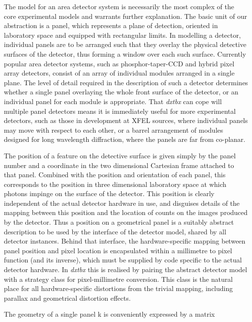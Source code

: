 \documentclass[preprint]{iucr}
\newcommand{\dxtbx}{\emph{dxtbx}\xspace}
\begin{document}
The model for an area detector system is necessarily the most complex of the 
core experimental models and warrants further explanation. The basic unit of our 
abstraction is a panel, which represents a plane of detection, oriented in 
laboratory space and equipped with rectangular limits. In modelling a detector,
individual panels are to be arranged such that they overlay the physical 
detective surfaces of the detector, thus forming a window over each such surface. 
Currently popular area detector systems, such as phosphor-taper-CCD and hybrid 
pixel array detectors, consist of an array of individual modules arranged in a 
single plane. The level of detail required in the description of such a detector 
determines whether a single panel overlaying the whole front surface of the 
detector, or an individual panel for each module is appropriate. That \dxtbx can 
cope will multiple panel detectors means it is immediately useful for more 
experimental detectors, such as those in development at XFEL sources, where 
individual panels may move with respect to each other, or a barrel arrangement 
of modules designed for long wavelength diffraction, where the panels are far 
from co-planar.

The position of a feature on the detective surface is given simply by the panel 
number and a coordinate in the two dimensional Cartesian frame attached to that 
panel. Combined with the position and orientation of each panel, this corresponds 
to the position in three dimensional laboratory space at which photons impinge 
on the surface of the detector. This position is clearly independent of the 
actual detector hardware in use, and disguises details of the mapping between 
this position and the location of counts on the images produced by the detector. 
Thus a position on a geometrical panel is a suitably abstract description to be 
used by the interface of the detector model, shared by all detector instances. 
Behind that interface, the hardware-specific mapping between panel position and 
pixel location is encapsulated within a millimetre to pixel function (and its 
inverse), which must be supplied by code specific to the actual detector 
hardware. In \dxtbx this is realised by pairing the abstract detector model with 
a strategy class \cite{Gamma1994} for pixel-millimetre conversion. This class 
is the natural place for all hardware-specific distortions from the trivial 
mapping, including parallax and geometrical distortion effects.

The geometry of a single panel k is conveniently expressed by a matrix
\end{document}
